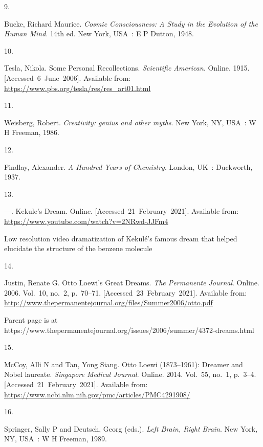 \documentclass[
  a4paper,
]{article}
\newlength{\cslhangindent}
\newlength{\csllabelwidth}
\newlength{\cslentryspacingunit} %
\newenvironment{CSLReferences}[2] %
 {%
  \setlength{\parindent}{0pt}
  \ifodd #1
  \let\oldpar\par
  \def\par{\hangindent=\cslhangindent\oldpar}
  \fi
  \setlength{\parskip}{#2\cslentryspacingunit}
 }%
 {}
\newcommand{\CSLLeftMargin}[1]{\parbox[t]{\csllabelwidth}{#1}}
\newcommand{\CSLRightInline}[1]{\parbox[t]{\linewidth - \csllabelwidth}{#1}\break}
\begin{document}
\begin{CSLReferences}{0}{0}
\leavevmode{}%
\CSLLeftMargin{9. }%
\CSLRightInline{Bucke, Richard Maurice. \emph{{Cosmic Consciousness: A
Study in the Evolution of the Human Mind}}. 14th ed. New York, USA~: E P
Dutton, 1948. }

\leavevmode{}%
\CSLLeftMargin{10. }%
\CSLRightInline{Tesla, Nikola. {Some Personal Recollections}.
\emph{Scientific American}. Online. 1915. {[}Accessed~6~June~2006{]}.
Available from: \url{https://www.pbs.org/tesla/res/res_art01.html}}

\leavevmode{}%
\CSLLeftMargin{11. }%
\CSLRightInline{Weisberg, Robert. \emph{{Creativity: genius and other
myths}}. New York, NY, USA~: W H Freeman, 1986. }

\leavevmode{}%
\CSLLeftMargin{12. }%
\CSLRightInline{Findlay, Alexander. \emph{{A Hundred Years of
Chemistry}}. London, UK~: Duckworth, 1937. }

\leavevmode{}%
\CSLLeftMargin{13. }%
\CSLRightInline{---. {Kekule's Dream}. Online.
{[}Accessed~21~February~2021{]}. Available from:
\url{https://www.youtube.com/watch?v=2NRwd-JJFm4}}%
\CSLRightInline{Low resolution video dramatization of Kekulé's famous
dream that helped elucidate the structure of the benzene molecule}

\leavevmode{}%
\CSLLeftMargin{14. }%
\CSLRightInline{Justin, Renate G. {Otto Loewi's Great Dreams}. \emph{The
Permanente Journal}. Online. 2006. Vol.~10, no.~2, p.~70--71.
{[}Accessed~23~February~2021{]}. Available from:
\url{http://www.thepermanentejournal.org/files/Summer2006/otto.pdf}}%
\CSLRightInline{Parent page is at
https://www.thepermanentejournal.org/issues/2006/summer/4372-dreams.html}

\leavevmode{}%
\CSLLeftMargin{15. }%
\CSLRightInline{McCoy, Alli N and Tan, Yong Siang. {Otto Loewi
(1873--1961): Dreamer and Nobel laureate}. \emph{Singapore Medical
Journal}. Online. 2014. Vol.~55, no.~1, p.~3--4.
{[}Accessed~21~February~2021{]}. Available from:
\url{https://www.ncbi.nlm.nih.gov/pmc/articles/PMC4291908/}}

\leavevmode{}%
\CSLLeftMargin{16. }%
\CSLRightInline{Springer, Sally P and Deutsch, Georg (eds.). \emph{{Left
Brain, Right Brain}}. New York, NY, USA~: W H Freeman, 1989. }


\end{CSLReferences}
\end{document}
